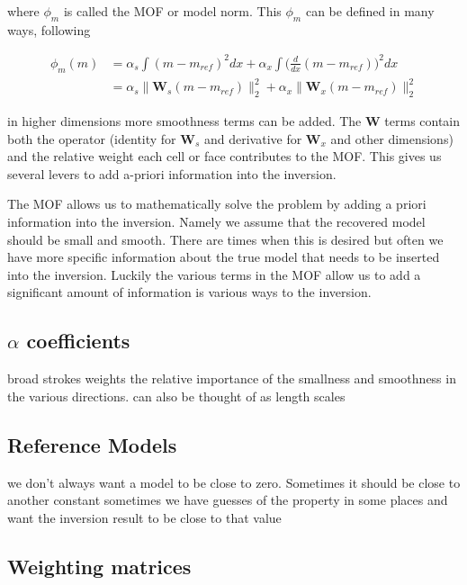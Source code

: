 where $\phi_m$ is called the \ac{MOF} or model norm. This $\phi_m$ can be defined in many ways, following  \cite{oldenburg2005inversion}

\begin{align}
\phi_m(m) &= \alpha_s\int(m-m_{ref})^2dx+\alpha_x\int\bigg(\frac{d}{dx}(m-m_{ref})\bigg)^2dx\\
&=\alpha_s\|\textbf{W}_s(m-m_{ref})\|^2_2+\alpha_x\|\textbf{W}_x(m-m_{ref})\|^2_2
\end{align}
\label{eq:MOF}

in higher dimensions more smoothness terms can be added. The $\textbf{W}$ terms contain both the operator (identity for $\textbf{W}_s$ and derivative for $\textbf{W}_x$ and other dimensions) and the relative weight each cell or face contributes to the \ac{MOF}. This gives us several levers to add a-priori information into the inversion.

The \ac{MOF} allows us to mathematically solve the problem by adding a priori information into the inversion. Namely we assume that the recovered model should be small and smooth. There are times when this is desired but often we have more specific information about the true model that needs to be inserted into the inversion. Luckily the various terms in the \ac{MOF} allow us to add a significant amount of information is various ways to the inversion.

\subsection{$\alpha$ coefficients}
\label{sec:alpha coefficients}

broad strokes weights the relative importance of the smallness and smoothness in the various directions. can also be thought of as length scales

\subsection{Reference Models}
\label{sec:Reference Models}

we don't always want a model to be close to zero. Sometimes it should be close to another constant sometimes we have guesses of the property in some places and want the inversion result to be close to that value

\subsection{Weighting matrices}
\label{sec:Weighting matrices}

